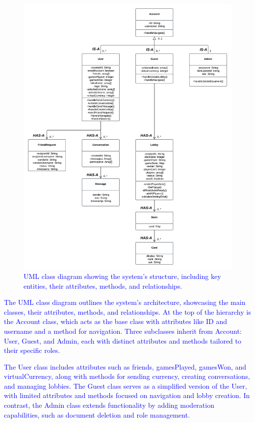 \begin{figure}[H]
    \centering
    \includegraphics[width=1\linewidth]{CS482 Sequence Diagram Sprint 3.png}
    \caption{\textcolor{blue}{UML class diagram showing the system's structure, including key entities, their attributes, methods, and relationships.}}
    \label{fig:umlclass}
\end{figure}
\vspace{-1em}
\noindent \textcolor{blue}{The UML class diagram outlines the system's architecture, showcasing the main classes, their attributes, methods, and relationships. At the top of the hierarchy is the Account class, which acts as the base class with attributes like ID and username and a method for navigation. Three subclasses inherit from Account: User, Guest, and Admin, each with distinct attributes and methods tailored to their specific roles.}

\noindent \textcolor{blue}{The User class includes attributes such as friends, gamesPlayed, gamesWon, and virtualCurrency, along with methods for sending currency, creating conversations, and managing lobbies. The Guest class serves as a simplified version of the User, with limited attributes and methods focused on navigation and lobby creation. In contrast, the Admin class extends functionality by adding moderation capabilities, such as document deletion and role management.}

